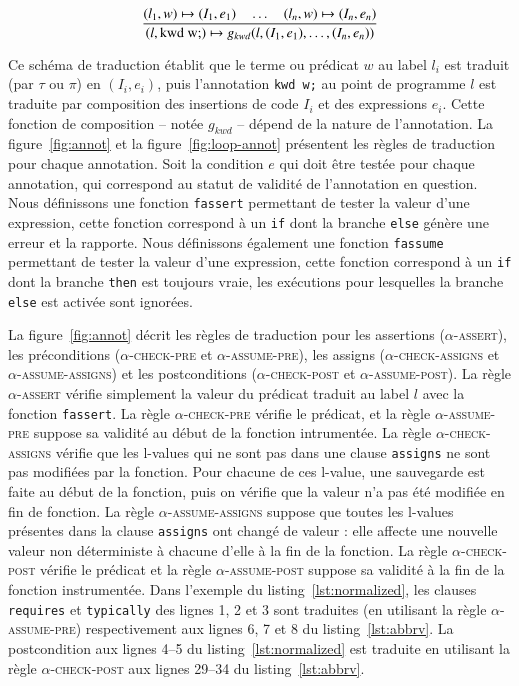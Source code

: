 \vspace{-4mm}
\[
\dfrac
    {(l_1, w) \rulearrow (I_1, e_1) \quad \ldots \quad
      (l_n, w) \rulearrow (I_n, e_n)}
    {(l, \mbox{\lstinline'kwd w;'}) \rulearrow
      g_{kwd} (l, (I_1, e_1), \ldots, (I_n, e_n))}
\]
\vspace{-4mm}


Ce schéma de traduction établit que le terme ou prédicat $w$ au label $l_i$ est
traduit (par $\tau$ ou $\pi$) en $(I_i, e_i)$, puis l'annotation
\lstinline'kwd w;' au point de programme $l$ est traduite par composition
des insertions de code $I_i$ et des expressions $e_i$.
Cette fonction de composition -- notée $g_{kwd}$ -- dépend de la nature de
l'annotation.
La figure~\ref{fig:annot} et la figure~\ref{fig:loop-annot} présentent les
règles de traduction pour chaque annotation.
Soit la condition $e$ qui doit être testée pour chaque annotation, qui
correspond au statut de validité de l'annotation en question.
Nous définissons une fonction \lstinline'fassert' permettant de tester la valeur
d'une expression, cette fonction correspond à un \lstinline'if' dont la branche
\lstinline'else' génère une erreur et la rapporte.
Nous définissons également une fonction \lstinline'fassume' permettant de tester
la valeur d'une expression, cette fonction correspond à un \lstinline'if' dont
la branche \lstinline'then' est toujours vraie, les exécutions pour lesquelles
la branche \lstinline'else' est activée sont ignorées.

La figure~\ref{fig:annot} décrit les règles de traduction pour les assertions
(\textsc{$\alpha$-assert}), les préconditions (\textsc{$\alpha$-check-pre} et
\textsc{$\alpha$-assume-pre}), les assigns (\textsc{$\alpha$-check-assigns} et
\textsc{$\alpha$-assume-assigns}) et les postconditions
(\textsc{$\alpha$-check-post} et \textsc{$\alpha$-assume-post}).
La règle \textsc{$\alpha$-assert} vérifie simplement la valeur du prédicat
traduit au label $l$ avec la fonction \lstinline'fassert'.
La règle \textsc{$\alpha$-check-pre} vérifie le prédicat, et la règle
\textsc{$\alpha$-assume-pre} suppose sa validité au début de la fonction
intrumentée.
La règle \textsc{$\alpha$-check-assigns} vérifie que les l-values qui ne sont
pas dans une clause \lstinline'assigns' ne sont pas modifiées par la fonction.
Pour chacune de ces l-value, une sauvegarde est faite au début de la fonction,
puis on vérifie que la valeur n'a pas été modifiée en fin de fonction.
La règle \textsc{$\alpha$-assume-assigns} suppose que toutes les l-values
présentes dans la clause \lstinline'assigns' ont changé de valeur : elle affecte
une nouvelle valeur non déterministe à chacune d'elle à la fin de la fonction.
La règle \textsc{$\alpha$-check-post} vérifie le prédicat et la règle
\textsc{$\alpha$-assume-post} suppose sa validité à la fin de la fonction
instrumentée.
Dans l'exemple du listing~\ref{lst:normalized}, les clauses \lstinline'requires'
et \lstinline'typically' des lignes 1, 2 et 3 sont traduites (en utilisant la
règle \textsc{$\alpha$-assume-pre}) respectivement aux lignes 6, 7 et 8 du
listing~\ref{lst:abbrv}.
La postcondition aux lignes 4--5 du listing~\ref{lst:normalized} est traduite
en utilisant la règle \textsc{$\alpha$-check-post} aux lignes 29--34 du
listing~\ref{lst:abbrv}.

